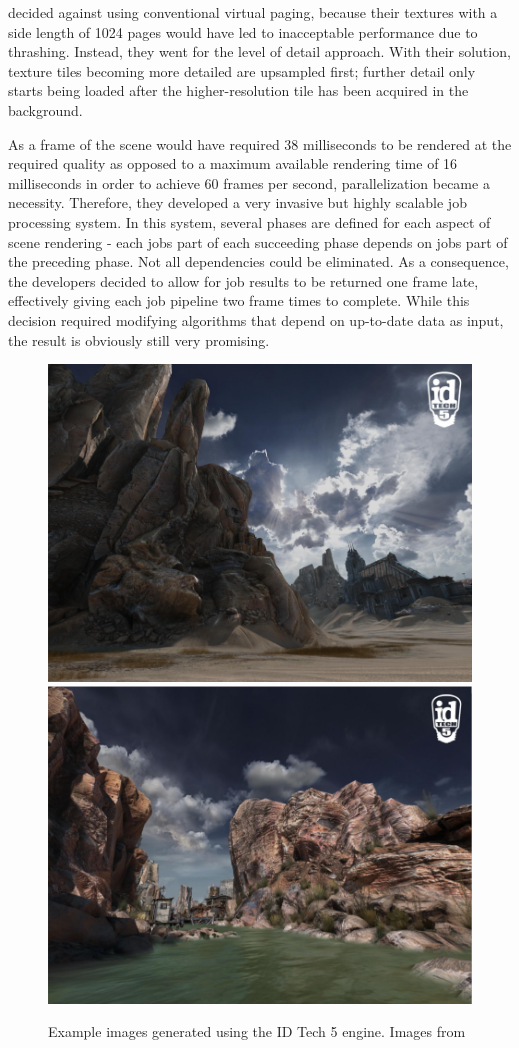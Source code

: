 \cite{van2009id} decided against using conventional virtual paging, because their textures with a side length of 1024 pages would have led to inacceptable performance due to thrashing. Instead, they went for the level of detail approach. With their solution, texture tiles becoming more detailed are upsampled first; further detail only starts being loaded after the higher-resolution tile has been acquired in the background.

As a frame of the scene would have required 38 milliseconds to be rendered at the required quality as opposed to a maximum available rendering time of 16 milliseconds in order to achieve 60 frames per second, parallelization became a necessity. Therefore, they developed a very invasive but highly scalable job processing system. In this system, several phases are defined for each aspect of scene rendering - each jobs part of each succeeding phase depends on jobs part of the preceding phase. Not all dependencies could be eliminated. As a consequence, the developers decided to allow for job results to be returned one frame late, effectively giving each job pipeline two frame times to complete. While this decision required modifying algorithms that depend on up-to-date data as input, the result is obviously still very promising.

\begin{figure}[h]
  \begin{center}
    \includegraphics[width=.4\textwidth]{logos/id_tech_5_1.png}
    \hfill
    \includegraphics[width=.4\textwidth]{logos/id_tech_5_2.png}
    \caption{Example images generated using the ID Tech 5 engine. Images from \cite{van2009id}}
  \end{center}
\end{figure}

